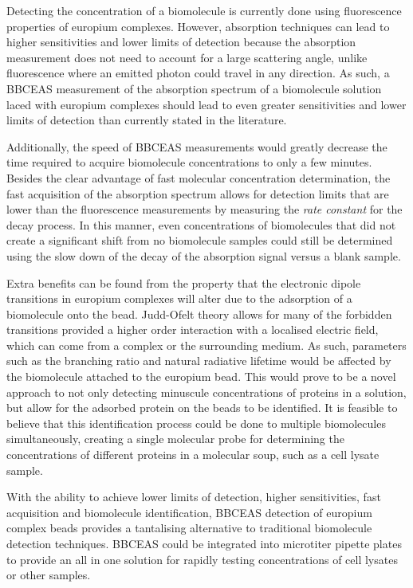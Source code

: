 Detecting the concentration of a biomolecule is currently done using
fluorescence properties of europium complexes. However, absorption techniques
can lead to higher sensitivities and lower limits of detection because the
absorption measurement does not need to account for a large scattering angle,
unlike fluorescence where an emitted photon could travel in any
direction. As such, a \ac{BBCEAS} measurement of the
absorption spectrum of a biomolecule solution laced with europium complexes
should lead to even greater sensitivities and lower limits of detection than
currently stated in the literature.

Additionally, the speed of \ac{BBCEAS} measurements would greatly decrease the
time required to acquire biomolecule concentrations to only a few minutes.
Besides the clear advantage of fast molecular concentration determination, the
fast acquisition of the absorption spectrum allows for detection limits that
are lower than the fluorescence measurements by measuring the \emph{rate
constant} for the decay process. In this manner, even concentrations of
biomolecules that did not create a significant shift from no biomolecule
samples could still be determined using the slow down of the decay of the
absorption signal versus a blank sample.

Extra benefits can be found from the property that the electronic dipole
transitions in europium complexes will alter due to the adsorption of a
biomolecule onto the bead. Judd-Ofelt theory allows for many of the forbidden
transitions provided a higher order interaction with a localised electric
field, which can come from a complex or the surrounding medium. As such,
parameters such as the branching ratio and natural radiative lifetime would be
affected by the biomolecule attached to the europium bead.  This would prove to
be a novel approach to not only detecting minuscule concentrations of proteins
in a solution, but allow for the adsorbed protein on the beads to be
identified. It is feasible to believe that this identification process could be
done to multiple biomolecules simultaneously, creating a single molecular probe
for determining the concentrations of different proteins in a molecular soup,
such as a cell lysate sample.

With the ability to achieve lower limits of detection, higher sensitivities,
fast acquisition and biomolecule identification, \ac{BBCEAS} detection of
europium complex beads provides a tantalising alternative to traditional
biomolecule detection techniques. \ac{BBCEAS} could be integrated into
microtiter pipette plates to provide an all in one solution for rapidly
testing concentrations of cell lysates or other samples.



